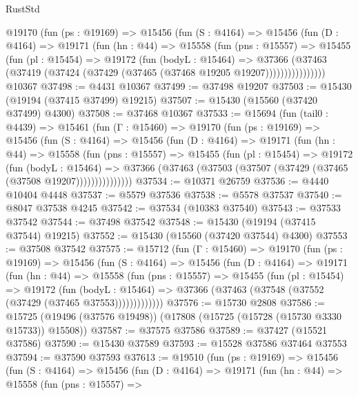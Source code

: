 \begin{lexlean}{RustStd}
\begin{coremodule}
        @19170
          (fun (ps : @19169) =>
          @15456
            (fun (S : @4164) =>
            @15456
              (fun (D : @4164) =>
              @19171
                (fun (hn : @44) =>
                @15558
                  (fun (pns : @15557) =>
                  @15455
                    (fun (pl : @15454) =>
                    @19172
                      (fun (bodyL : @15464) =>
                      @37366
                        (@37463
                          (@37419 (@37424 (@37429 (@37465 (@37468 @19205 @19207))))))))))))))))
    @10367
@37498 := @4431 @10367
@37499 := @37498 @19207
@37503 := @15430 (@19194 (@37415 @37499) @19215)
@37507 := @15430 (@15560 (@37420 @37499) @4300)
@37508 := @37468 @10367
@37533 := @15694
    (fun (tail0 : @4439) =>
    @15461
      (fun (Γ : @15460) =>
      @19170
        (fun (ps : @19169) =>
        @15456
          (fun (S : @4164) =>
          @15456
            (fun (D : @4164) =>
            @19171
              (fun (hn : @44) =>
              @15558
                (fun (pns : @15557) =>
                @15455
                  (fun (pl : @15454) =>
                  @19172
                    (fun (bodyL : @15464) =>
                    @37366 (@37463 (@37503 (@37507 (@37429 (@37465 (@37508 @19207)))))))))))))))
@37534 := @10371 @26759
@37536 := @4440 @10404 @4448
@37537 := @5579 @37536
@37538 := @5578 @37537
@37540 := @8047 @37538 @4245
@37542 := @37534 (@10383 @37540)
@37543 := @37533 @37542
@37544 := @37498 @37542
@37548 := @15430 (@19194 (@37415 @37544) @19215)
@37552 := @15430 (@15560 (@37420 @37544) @4300)
@37553 := @37508 @37542
@37575 := @15712
    (fun (Γ : @15460) =>
    @19170
      (fun (ps : @19169) =>
      @15456
        (fun (S : @4164) =>
        @15456
          (fun (D : @4164) =>
          @19171
            (fun (hn : @44) =>
            @15558
              (fun (pns : @15557) =>
              @15455
                (fun (pl : @15454) =>
                @19172
                  (fun (bodyL : @15464) =>
                  @37366 (@37463 (@37548 (@37552 (@37429 (@37465 @37553)))))))))))))
@37576 := @15730 @2808
@37586 := @15725 (@19496 (@37576 @19498)) (@17808 (@15725 (@15728 (@15730 @3330 @15733)) @15508))
@37587 := @37575 @37586
@37589 := @37427 (@15521 @37586)
@37590 := @15430 @37589
@37593 := @15528 @37586 @37464 @37553
@37594 := @37590 @37593
@37613 := @19510
    (fun (ps : @19169) =>
    @15456
      (fun (S : @4164) =>
      @15456
        (fun (D : @4164) =>
        @19171
          (fun (hn : @44) =>
          @15558
            (fun (pns : @15557) =>

\end{coremodule}
\end{lexlean}
